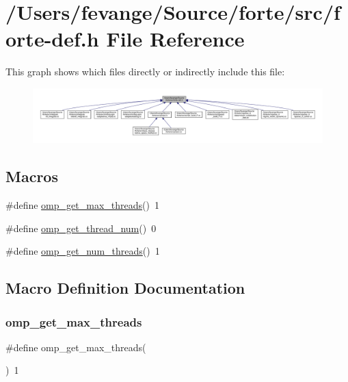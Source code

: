 \hypertarget{forte-def_8h}{}\section{/\+Users/fevange/\+Source/forte/src/forte-\/def.h File Reference}
\label{forte-def_8h}
This graph shows which files directly or indirectly include this file\+:
\nopagebreak
\begin{figure}[H]
\begin{center}
\leavevmode
\includegraphics[width=350pt]{forte-def_8h__dep__incl}
\end{center}
\end{figure}
\subsection*{Macros}
\begin{DoxyCompactItemize}
\item 
\#define \mbox{\hyperlink{forte-def_8h_a59e73060d1552ccda56039c7f3d25a84}{omp\+\_\+get\+\_\+max\+\_\+threads}}()~1
\item 
\#define \mbox{\hyperlink{forte-def_8h_a889ec205c635b219999c761b28cc39ba}{omp\+\_\+get\+\_\+thread\+\_\+num}}()~0
\item 
\#define \mbox{\hyperlink{forte-def_8h_a4353281743925f182316dba7cda58fee}{omp\+\_\+get\+\_\+num\+\_\+threads}}()~1
\end{DoxyCompactItemize}


\subsection{Macro Definition Documentation}
\mbox{\label{forte-def_8h_a59e73060d1552ccda56039c7f3d25a84}} 
\subsubsection{\texorpdfstring{omp\+\_\+get\+\_\+max\+\_\+threads}{omp\_get\_max\_threads}}
{\footnotesize\ttfamily \#define omp\+\_\+get\+\_\+max\+\_\+threads(\begin{DoxyParamCaption}{ }\end{DoxyParamCaption})~1}

